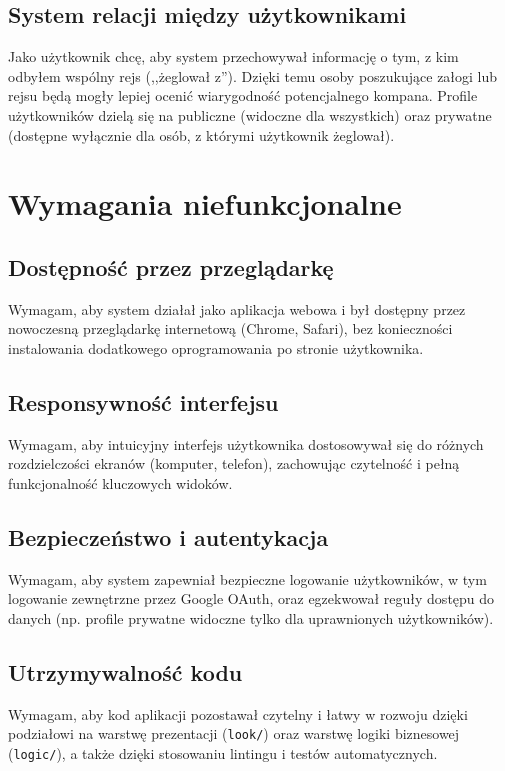 \documentclass[shortabstract]{iithesis}
\begin{document}
\subsection{System relacji między użytkownikami}
Jako użytkownik chcę, aby system przechowywał informację o tym, z kim odbyłem wspólny rejs (,,żeglował z''). Dzięki temu osoby poszukujące załogi lub rejsu będą mogły lepiej ocenić wiarygodność potencjalnego kompana. Profile użytkowników dzielą się na publiczne (widoczne dla wszystkich) oraz prywatne (dostępne wyłącznie dla osób, z którymi użytkownik żeglował).

\section{Wymagania niefunkcjonalne}

\subsection{Dostępność przez przeglądarkę}
Wymagam, aby system działał jako aplikacja webowa i był dostępny przez nowoczesną przeglądarkę internetową (Chrome, Safari), bez konieczności instalowania dodatkowego oprogramowania po stronie użytkownika.

\subsection{Responsywność interfejsu}
Wymagam, aby intuicyjny interfejs użytkownika dostosowywał się do różnych rozdzielczości ekranów (komputer, telefon), zachowując czytelność i pełną funkcjonalność kluczowych widoków.

\subsection{Bezpieczeństwo i autentykacja}
Wymagam, aby system zapewniał bezpieczne logowanie użytkowników, w tym logowanie zewnętrzne przez Google OAuth, oraz egzekwował reguły dostępu do danych (np. profile prywatne widoczne tylko dla uprawnionych użytkowników).

\subsection{Utrzymywalność kodu}
Wymagam, aby kod aplikacji pozostawał czytelny i łatwy w rozwoju dzięki podziałowi na warstwę prezentacji (\texttt{look/}) oraz warstwę logiki biznesowej (\texttt{logic/}), a także dzięki stosowaniu lintingu i testów automatycznych.
\end{document}
